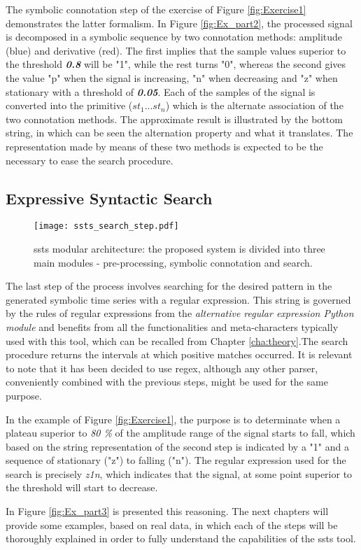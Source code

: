 The symbolic connotation step of the exercise of Figure \ref{fig:Exercise1} demonstrates the latter formalism. In Figure \ref{fig:Ex_part2}, the processed signal is decomposed in a symbolic sequence by two connotation methods: amplitude (blue) and derivative (red). The first implies that the sample values superior to the threshold \textit{\textbf{0.8}} will be "1", while the rest turns "0", whereas the second gives the value "p" when the signal is increasing, "n" when decreasing and "z" when stationary with a threshold of \textit{\textbf{0.05}}. Each of the samples of the signal is converted into the primitive ($st_1...st_n$) which is the alternate association of the two connotation methods. The approximate result is illustrated by the bottom string, in which can be seen the alternation property and what it translates. The representation made by means of these two methods is expected to be the necessary to ease the search procedure.

\subsection{Expressive Syntactic Search}

\begin{figure}
\centering
\texttt{[image: ssts\_search\_step.pdf]}
\label{fig:ssts_search}
\caption{\gls{ssts} modular architecture: the proposed system is divided into three main modules - pre-processing, symbolic connotation and search.}
\end{figure}

The last step of the process involves searching for the desired pattern in the generated symbolic time series with a regular expression. This string is governed by the rules of regular expressions from the \textit{alternative regular expression Python module} \cite{rgxPy} and benefits from all the functionalities and meta-characters typically used with this tool, which can be recalled from Chapter \ref{cha:theory}.The search procedure returns the intervals at which positive matches occurred. It is relevant to note that it has been decided to use \gls{regex}, although any other parser, conveniently combined with the previous steps, might be used for the same purpose.
\par
In the example of Figure \ref{fig:Exercise1}, the purpose is to determinate when a plateau superior to \textit{80 \%} of the amplitude range of the signal starts to fall, which based on the string representation of the second step is indicated by a "1" and a sequence of stationary ("z") to falling ("n"). The regular expression used for the search is precisely \textit{z1n}, which indicates that the signal, at some point superior to the threshold will start to decrease. 
\par
In Figure \ref{fig:Ex_part3} is presented this reasoning.
The next chapters will provide some examples, based on real data, in which each of the steps will be thoroughly explained in order to fully understand the capabilities of the \gls{ssts} tool.








